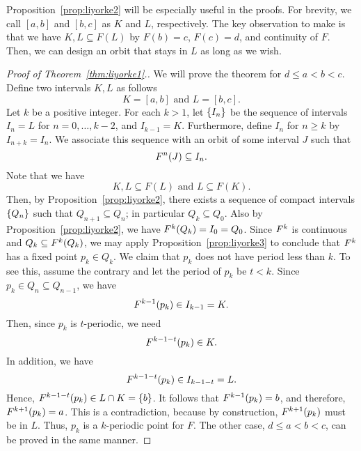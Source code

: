 \documentclass[10pt,draft,twoside]{book}
\begin{document}
Proposition~\ref{prop:liyorke2} will be especially useful in the proofs.
For brevity, we call $[a,b]$ and $[b,c]$ as $K$ and $L$, respectively.
The key observation to make is that we have $K,L \subseteq F(L)$ by $F(b) = c$, $F(c) = d$, and continuity of $F$.
Then, we can design an orbit that stays in $L$ as long as we wish.
\begin{proof}[Proof of Theorem~\ref{thm:liyorke1}.]
  We will prove the theorem for $d \leq a < b < c$.
  Define two intervals $K,L$ as follows
  \begin{equation*}
    K = [a,b] \mbox{ and } L = [b,c].
  \end{equation*}
  Let $k$ be a positive integer.
  For each $k > 1$, let $\left \{ I_n \right \}$ be the sequence of intervals $I_n = L$ for $n = 0, \ldots, k-2$, and $I_{k-1} = K$.
  Furthermore, define $I_n$ for $n \geq k$ by $I_{n+k} = I_n$.
  We associate this sequence with an orbit of some interval $J$ such that
  \begin{equation*}
    F^{n}(J) \subseteq I_n.
  \end{equation*}
  Note that we have 
  \begin{equation*}
    K,L \subseteq F(L) \mbox{ and } L \subseteq F(K).
  \end{equation*}
  Then, by Proposition~\ref{prop:liyorke2}, there exists a sequence of compact intervals $\left \{ Q_n \right \}$ such that $Q_{n+1} \subseteq Q_{n}$; in particular $Q_k \subseteq Q_0$.
  Also by Proposition~\ref{prop:liyorke2}, we have $F^{k}(Q_k) = I_0 = Q_0$.
  Since $F^{k}$ is continuous and $Q_k \subseteq F^{k}(Q_k)$, we may apply Proposition~\ref{prop:liyorke3} to conclude that $F^{k}$ has a fixed point $p_k \in Q_k$.
  We claim that $p_k$ does not have period less than $k$.
  To see this, assume the contrary and let the period of $p_k$ be $t < k$.
  Since $p_k \in Q_n \subseteq Q_{n-1}$, we have 
  \begin{equation*}
    F^{k-1}(p_k) \in I_{k-1} = K.
  \end{equation*}
  Then, since $p_k$ is $t$-periodic, we need 
  \begin{equation*}
    F^{k-1-t}(p_k) \in K.
  \end{equation*}
  In addition, we have
  \begin{equation*}
    F^{k-1-t}(p_k) \in I_{k-1-t} = L.
  \end{equation*}
  Hence, $F^{k-1-t}(p_k) \in L \cap K = \left \{ b \right \}$.
  It follows that $F^{k-1}(p_k) = b$, and therefore, $F^{k+1}(p_k) = a$.
  This is a contradiction, because by construction, $F^{k+1}(p_k)$ must be in $L$.
  Thus, $p_k$ is a $k$-periodic point for $F$.
  The other case, $d \leq a < b < c$, can be proved in the same manner.
\end{proof}
\end{document}
